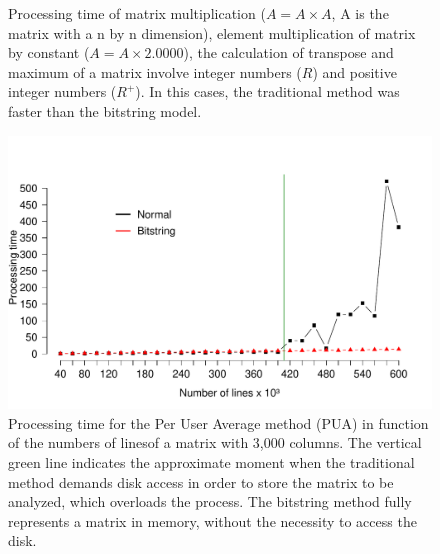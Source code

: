 \documentclass[10pt]{article}
\begin{document}
\begin{figure}[h]
{  }
  \caption{Processing time of matrix multiplication ($A = A \times A$, A is the 
matrix with a n by n dimension), 
  element multiplication of matrix by constant ($A=A \times 2.0000$), the 
calculation of transpose and maximum of a 
  matrix involve integer numbers ($R$) and positive integer numbers ($R^+$). In 
this cases, the traditional 
  method was faster than the bitstring model.}
  \label{fig:35363738}
\end{figure}

\begin{figure}[h]
  \centering
  \includegraphics[scale=0.6,clip]{fig39}
  \caption{Processing time for the Per User Average method (PUA) in function of 
the numbers of linesof a matrix 
  with 3,000 columns. The vertical green line indicates the approximate moment 
when the traditional method  
  demands  disk access in order to store the matrix to be analyzed, which  
overloads the process. The bitstring 
  method fully represents a matrix  in memory, without the necessity to access 
the  disk.}
  \label{fig39}
\end{figure}
\end{document}
